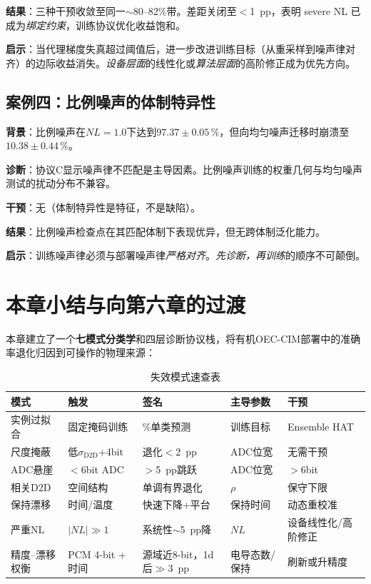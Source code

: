 \textbf{结果}：三种干预收敛至同一$\sim$80--82\%带。差距关闭至$<$1~pp，表明 severe NL 已成为\emph{绑定约束}，训练协议优化收益饱和。

\textbf{启示}：当代理梯度失真超过阈值后，进一步改进训练目标（从重采样到噪声律对齐）的边际收益消失。\emph{设备层面}的线性化或\emph{算法层面}的高阶修正成为优先方向。

\subsection{案例四：比例噪声的体制特异性}
\label{subsec:case_proportional}

\textbf{背景}：比例噪声在$NL=1.0$下达到$97.37\pm0.05\,\%$，但向均匀噪声迁移时崩溃至$10.38\pm0.44\,\%$。

\textbf{诊断}：协议C显示噪声律不匹配是主导因素。比例噪声训练的权重几何与均匀噪声测试的扰动分布不兼容。

\textbf{干预}：无（体制特异性是特征，不是缺陷）。

\textbf{结果}：比例噪声检查点在其匹配体制下表现优异，但无跨体制泛化能力。

\textbf{启示}：训练噪声律必须与部署噪声律\emph{严格对齐}。\emph{先诊断，再训练}的顺序不可颠倒。


\section{本章小结与向第六章的过渡}
\label{sec:ch5_summary}

本章建立了一个\textbf{七模式分类学}和四层诊断协议栈，将有机OEC-CIM部署中的准确率退化归因到可操作的物理来源：

\begin{table}[htbp]
\centering
\caption{失效模式速查表}
\label{tab:failure_mode_cheatsheet}
\small
\begin{tabularx}{\textwidth}{@{}>{\raggedright\arraybackslash}p{}>{\raggedright\arraybackslash}X>{\raggedright\arraybackslash}X>{\raggedright\arraybackslash}p{}>{\raggedright\arraybackslash}X@{}}
\toprule
\textbf{模式} & \textbf{触发} & \textbf{签名} & \textbf{主导参数} & \textbf{干预} \\
\midrule
实例过拟合 & 固定掩码训练 & 10\%单类预测 & 训练目标 & Ensemble HAT \\
尺度掩蔽 & 低$\sigma_{\mathrm{D2D}}$+4bit & 退化$<$2~pp & ADC位宽 & 无需干预 \\
ADC悬崖 & $<$6bit ADC & $>$5~pp跳跃 & ADC位宽 & $>$6bit \\
相关D2D & 空间结构 & 单调有界退化 & $\rho$ & 保守下限 \\
保持漂移 & 时间/温度 & 快速下降+平台 & 保持时间 & 动态重校准 \\
严重NL & $|NL|\gg1$ & 系统性$\sim$5~pp降 & $NL$ & 设备线性化/高阶修正 \\
精度--漂移权衡 & PCM 4-bit + 时间 & 源域近8-bit，1d后$\gg$3~pp & 电导态数/保持 & 刷新或升精度 \\
\bottomrule
\end{tabularx}
\end{table}


